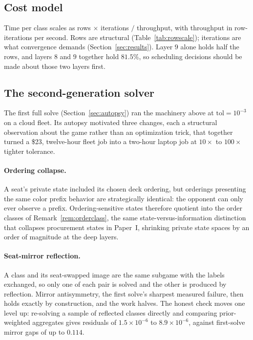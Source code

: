 \documentclass[11pt]{article}
\theoremstyle{plain}
\theoremstyle{definition}
\theoremstyle{remark}
\begin{document}
\subsection{Cost model}\label{sec:cost}

Time per class scales as rows $\times$ iterations $/$ throughput, with
throughput in row-iterations per second. Rows are structural
(Table~\ref{tab:rowscale}); iterations are what convergence demands
(Section~\ref{sec:results}). Layer $9$ alone holds half the rows, and layers $8$
and $9$ together hold $81.5\%$, so scheduling decisions should be made about
those two layers first.

\subsection{The second-generation solver}\label{sec:gen2}

The first full solve (Section~\ref{sec:autopsy}) ran the machinery above at
$\mathrm{tol}=10^{-3}$ on a cloud fleet. Its autopsy motivated three changes,
each a structural observation about the game rather than an optimization trick,
that together turned a \$23, twelve-hour fleet job into a two-hour laptop job at
$10\times$ to $100\times$ tighter tolerance.

\paragraph{Ordering collapse.} A seat's private state included its chosen deck
ordering, but orderings presenting the same color prefix behavior are
strategically identical: the opponent can only ever observe a prefix.
Ordering-sensitive states therefore quotient into the order classes of
Remark~\ref{rem:orderclass}, the same state-versus-information distinction that
collapses procurement states in Paper~I, shrinking private state spaces by an
order of magnitude at the deep layers.

\paragraph{Seat-mirror reflection.} A class and its seat-swapped image are the
same subgame with the labels exchanged, so only one of each pair is solved and
the other is produced by reflection. Mirror antisymmetry, the first solve's
sharpest measured failure, then holds exactly by construction, and the work
halves. The honest check moves one level up: re-solving a sample of reflected
classes directly and comparing prior-weighted aggregates gives residuals of
$1.5\times10^{-6}$ to $8.9\times10^{-6}$, against first-solve mirror gaps of up
to $0.114$.
\end{document}
